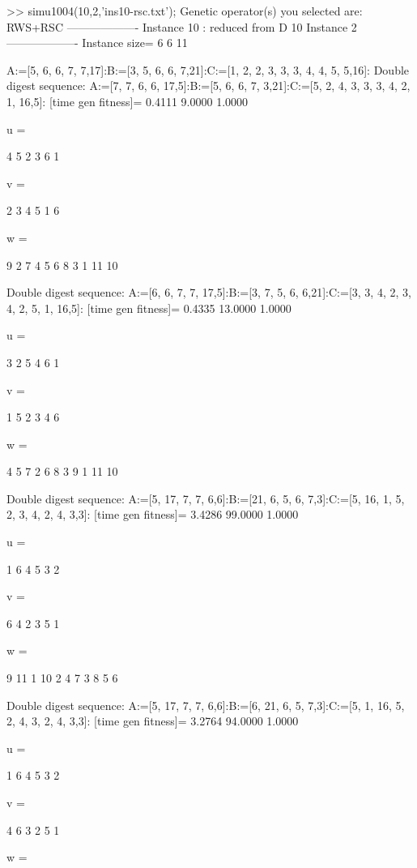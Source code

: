 >> simu1004(10,2,'ins10-rsc.txt');
Genetic operator(s) you selected are:
RWS+RSC
------------------- Instance 10 : reduced from D 10 Instance 2 -------------------
Instance size=
     6     6    11

A:=[5, 6, 6, 7, 7,17]:B:=[3, 5, 6, 6, 7,21]:C:=[1, 2, 2, 3, 3, 3, 4, 4, 5, 5,16]:
Double digest sequence:
A:=[7, 7, 6, 6, 17,5]:B:=[5, 6, 6, 7, 3,21]:C:=[5, 2, 4, 3, 3, 3, 4, 2, 1, 16,5]:
[time gen fitness]=
    0.4111    9.0000    1.0000


u =

     4     5     2     3     6     1


v =

     2     3     4     5     1     6


w =

     9     2     7     4     5     6     8     3     1    11    10

Double digest sequence:
A:=[6, 6, 7, 7, 17,5]:B:=[3, 7, 5, 6, 6,21]:C:=[3, 3, 4, 2, 3, 4, 2, 5, 1, 16,5]:
[time gen fitness]=
    0.4335   13.0000    1.0000


u =

     3     2     5     4     6     1


v =

     1     5     2     3     4     6


w =

     4     5     7     2     6     8     3     9     1    11    10

Double digest sequence:
A:=[5, 17, 7, 7, 6,6]:B:=[21, 6, 5, 6, 7,3]:C:=[5, 16, 1, 5, 2, 3, 4, 2, 4, 3,3]:
[time gen fitness]=
    3.4286   99.0000    1.0000


u =

     1     6     4     5     3     2


v =

     6     4     2     3     5     1


w =

     9    11     1    10     2     4     7     3     8     5     6

Double digest sequence:
A:=[5, 17, 7, 7, 6,6]:B:=[6, 21, 6, 5, 7,3]:C:=[5, 1, 16, 5, 2, 4, 3, 2, 4, 3,3]:
[time gen fitness]=
    3.2764   94.0000    1.0000


u =

     1     6     4     5     3     2


v =

     4     6     3     2     5     1


w =


